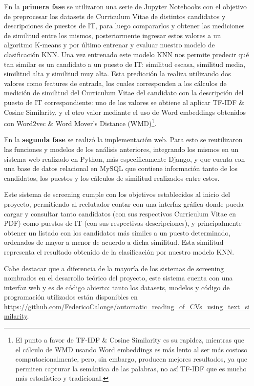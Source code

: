 \documentclass[12pt,a4paper]{article}
\begin{document}
\begin{sloppypar}
En la \textbf{primera fase} se utilizaron una serie de Jupyter Notebooks con el objetivo de preprocesar los datasets de Curriculum Vitae de distintos candidatos y descripciones de puestos de IT, para luego compararlos y obtener las mediciones de similitud entre los mismos, posteriormente ingresar estos valores a un algoritmo K-means y por último entrenar y evaluar nuestro modelo de clasificación KNN. Una vez entrenado este modelo KNN nos permite predecir qué tan similar es un candidato a un puesto de IT: similitud escasa, similitud media, similitud alta y similitud muy alta. Esta predicción la realiza utilizando dos valores como features de entrada, los cuales corresponden a los cálculos de medición de similitud del Curriculum Vitae del candidato con la descripción del puesto de IT correspondiente: uno de los valores se obtiene al aplicar TF-IDF \& Cosine Similarity, y el otro valor mediante el uso de Word embeddings obtenidos con Word2vec \& Word Mover’s Distance (WMD)\footnote{El punto a favor de TF-IDF \& Cosine Similarity es su rapidez, mientras que el cálculo de WMD usando Word embeddings es más lento al ser más costoso computacionalmente, pero, sin embargo, producen mejores resultados, ya que permiten capturar la semántica de las palabras, no así TF-IDF que es mucho más estadístico y tradicional.}. 

En la \textbf{segunda fase} se realizó la implementación web. Para esto se reutilizaron las funciones y modelos de los análisis anteriores, integrando los mismos en un sistema web realizado en Python, más específicamente Django, y que cuenta con una base de datos relacional en MySQL que contiene información tanto de los candidatos, los puestos y los cálculos de similitud realizados entre estos.

Este sistema de screening cumple con los objetivos establecidos al inicio del proyecto, permitiendo al reclutador contar con una interfaz gráfica donde pueda cargar y consultar tanto candidatos (con sus respectivos Curriculum Vitae en PDF) como puestos de IT (con sus respectivas descripciones), y principalmente obtener un listado con los candidatos más similes a un puesto determinado, ordenados de mayor a menor de acuerdo a dicha similitud. Esta similitud representa el resultado obtenido de la clasificación por nuestro modelo KNN. 

Cabe destacar que a diferencia de la mayoría de los sistemas de screening nombrados en el desarrollo teórico del proyecto, este sistema cuenta con una interfaz web y es de código abierto: tanto los datasets, modelos y código de programación utilizados están disponibles en \url{https://github.com/FedericoCalonge/automatic_reading_of_CVs_using_text_similarity}.


\end{sloppypar}
\end{document}
